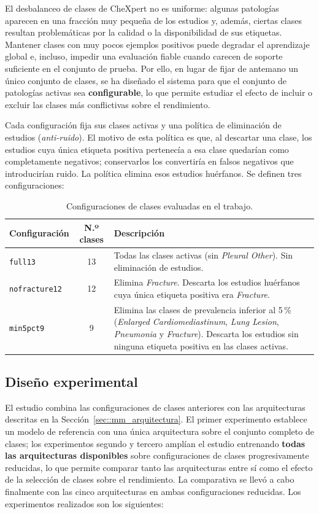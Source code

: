 El desbalanceo de clases de CheXpert no es uniforme: algunas patologías aparecen
en una fracción muy pequeña de los estudios y, además, ciertas clases resultan
problemáticas por la calidad o la disponibilidad de sus etiquetas. Mantener
clases con muy pocos ejemplos positivos puede degradar el aprendizaje global e,
incluso, impedir una evaluación fiable cuando carecen de soporte suficiente en el
conjunto de prueba. Por ello, en lugar de fijar de antemano un único conjunto de
clases, se ha diseñado el sistema para que el conjunto de patologías activas sea
\textbf{configurable}, lo que permite estudiar el efecto de incluir o excluir las
clases más conflictivas sobre el rendimiento.

Cada configuración fija sus clases activas y una política de eliminación de
estudios (\textit{anti-ruido}). El motivo de esta política es que, al descartar
una clase, los estudios cuya única etiqueta positiva pertenecía a esa clase
quedarían como completamente negativos; conservarlos los convertiría en falsos
negativos que introducirían ruido. La política elimina esos estudios huérfanos.
Se definen tres configuraciones:

\begin{table}[h]
\centering
\begin{tabularx}{\textwidth}{l c X}
\toprule
\textbf{Configuración} & \textbf{N.º clases} & \textbf{Descripción} \\
\midrule
\texttt{full13} & 13 & Todas las clases activas (sin \textit{Pleural Other}). Sin eliminación de estudios. \\
\texttt{nofracture12} & 12 & Elimina \textit{Fracture}. Descarta los estudios huérfanos cuya única etiqueta positiva era \textit{Fracture}. \\
\texttt{min5pct9} & 9 & Elimina las clases de prevalencia inferior al 5\,\% (\textit{Enlarged Cardiomediastinum}, \textit{Lung Lesion}, \textit{Pneumonia} y \textit{Fracture}). Descarta los estudios sin ninguna etiqueta positiva en las clases activas. \\
\bottomrule
\end{tabularx}
\caption{Configuraciones de clases evaluadas en el trabajo.}
\label{tab::mm_configs}
\end{table}

\subsection{Diseño experimental}

El estudio combina las configuraciones de clases anteriores con las arquitecturas
descritas en la Sección~\ref{sec::mm_arquitectura}. El primer experimento
establece un modelo de referencia con una única arquitectura sobre el conjunto
completo de clases; los experimentos segundo y tercero amplían el estudio
entrenando \textbf{todas las arquitecturas disponibles} sobre configuraciones de
clases progresivamente reducidas, lo que permite comparar tanto las arquitecturas
entre sí como el efecto de la selección de clases sobre el rendimiento. La
comparativa se llevó a cabo finalmente con las cinco arquitecturas en ambas
configuraciones reducidas. Los experimentos realizados son los siguientes:

